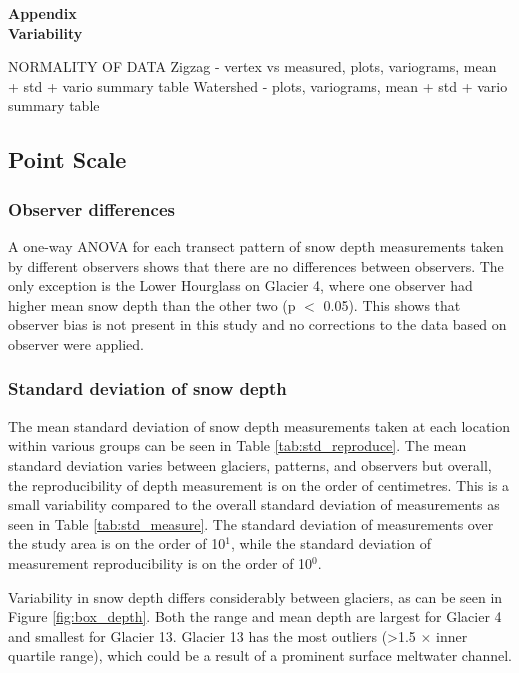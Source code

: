\documentclass[12pt]{article}
\begin{document}

\begin{center}
\Large \textbf{Appendix\\ Variability}
\end{center}

NORMALITY OF DATA
Zigzag
- vertex vs measured, plots, variograms, mean + std + vario summary table
Watershed
- plots, variograms, mean + std + vario summary table


\subsection*{Point Scale}

\subsubsection*{Observer differences}

A one-way ANOVA for each transect pattern of snow depth measurements taken by different observers  shows that there are no differences between observers. The only exception is the Lower Hourglass on Glacier 4, where one observer had higher mean snow depth than the other two (p $<$ 0.05). This shows that observer bias is not present in this study and no corrections to the data based on observer were applied.

\subsubsection*{Standard deviation of snow depth}

The mean standard deviation of snow depth measurements taken at each location within various groups can be seen in Table \ref{tab:std_reproduce}. The mean standard deviation varies between glaciers, patterns, and observers but overall, the reproducibility of depth measurement is on the order of centimetres. This is a small variability compared to the overall standard deviation of measurements as seen in Table \ref{tab:std_measure}. The standard deviation of measurements over the study area is on the order of 10$^1$, while the standard deviation of measurement reproducibility is on the order of 10$^0$. 

Variability in snow depth differs considerably between glaciers, as can be seen in Figure \ref{fig:box_depth}. Both the range and mean depth are largest for Glacier 4 and smallest for Glacier 13. Glacier 13 has the most outliers (\textgreater 1.5 $\times$ inner quartile range), which could be a result of a prominent surface meltwater channel. 
\end{document}
